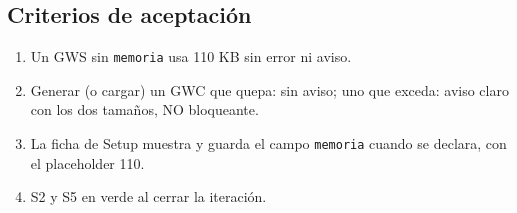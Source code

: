 \subsection{Criterios de aceptación}
\label{sec:F5I20Criterios}

\begin{enumerate}
	\item Un GWS sin \texttt{memoria} usa 110 KB sin error ni aviso.
	\item Generar (o cargar) un GWC que quepa: sin aviso; uno que exceda:
	aviso claro con los dos tamaños, NO bloqueante.
	\item La ficha de Setup muestra y guarda el campo \texttt{memoria}
	cuando se declara, con el placeholder 110.
	\item S2 y S5 en verde al cerrar la iteración.
\end{enumerate}
